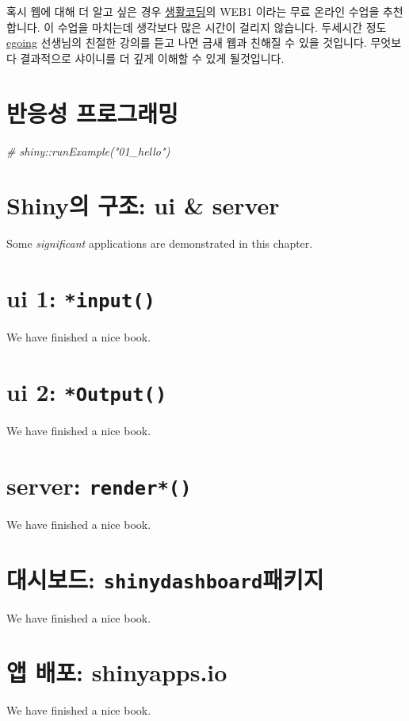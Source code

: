 \documentclass[]{book}
\newenvironment{Shaded}{\begin{snugshade}}{\end{snugshade}}
\newcommand{\CommentTok}[1]{\textcolor[rgb]{0.56,0.35,0.01}{\textit{#1}}}
\begin{document}
혹시 웹에 대해 더 알고 싶은 경우
\href{https://opentutorials.org/course/1}{생활코딩}의 WEB1 이라는 무료
온라인 수업을 추천합니다. 이 수업을 마치는데 생각보다 많은 시간이 걸리지
않습니다. 두세시간 정도 \href{https://github.com/egoing}{egoing}
선생님의 친절한 강의를 듣고 나면 금새 웹과 친해질 수 있을 것입니다.
무엇보다 결과적으로 샤이니를 더 깊게 이해할 수 있게 될것입니다.

\chapter{반응성 프로그래밍}\label{reactive}

\begin{Shaded}
\begin{Highlighting}[]
\CommentTok{# shiny::runExample("01_hello")}
\end{Highlighting}
\end{Shaded}

\chapter{Shiny의 구조: ui \& server}\label{structure}

Some \emph{significant} applications are demonstrated in this chapter.

\chapter{\texorpdfstring{ui 1:
\texttt{*input()}}{ui 1: *input()}}\label{ui1}

We have finished a nice book.

\chapter{\texorpdfstring{ui 2:
\texttt{*Output()}}{ui 2: *Output()}}\label{ui2}

We have finished a nice book.

\chapter{\texorpdfstring{server:
\texttt{render*()}}{server: render*()}}\label{server}

We have finished a nice book.

\chapter{\texorpdfstring{대시보드:
\texttt{shinydashboard}패키지}{대시보드: shinydashboard패키지}}\label{dashboard}

We have finished a nice book.

\chapter{앱 배포: shinyapps.io}\label{deploy}

We have finished a nice book.


\end{document}
